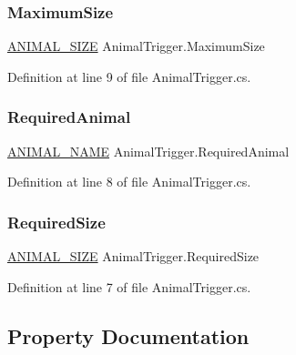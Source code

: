 \subsubsection{\texorpdfstring{Maximum\+Size}{MaximumSize}}
{\footnotesize\ttfamily \mbox{\hyperlink{_animal_8cs_ad0d15cd79bb3e3a97e7fb817f1438fcc}{A\+N\+I\+M\+A\+L\+\_\+\+S\+I\+ZE}} Animal\+Trigger.\+Maximum\+Size}



Definition at line 9 of file Animal\+Trigger.\+cs.

\mbox{\label{class_animal_trigger_aea34d32ba37a524d791680718161f31c}} 
\subsubsection{\texorpdfstring{Required\+Animal}{RequiredAnimal}}
{\footnotesize\ttfamily \mbox{\hyperlink{_animal_8cs_a2fa5713399b84d1b88dae9196837af50}{A\+N\+I\+M\+A\+L\+\_\+\+N\+A\+ME}} Animal\+Trigger.\+Required\+Animal}



Definition at line 8 of file Animal\+Trigger.\+cs.

\mbox{\label{class_animal_trigger_a8df6a540a57c386c2f76a4554ee7e057}} 
\subsubsection{\texorpdfstring{Required\+Size}{RequiredSize}}
{\footnotesize\ttfamily \mbox{\hyperlink{_animal_8cs_ad0d15cd79bb3e3a97e7fb817f1438fcc}{A\+N\+I\+M\+A\+L\+\_\+\+S\+I\+ZE}} Animal\+Trigger.\+Required\+Size}



Definition at line 7 of file Animal\+Trigger.\+cs.



\subsection{Property Documentation}
\mbox{\label{class_animal_trigger_a7962bd6370a474f0d8cb69726ac783e5}} 
